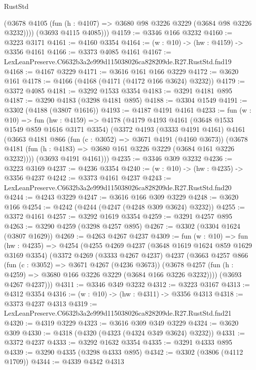 \begin{lexlean}{RustStd}
\begin{coremodule}
          (@3678 @4105 (fun (h : @4107) => @3680 @98 @3226 @3229 (@3684 @98 @3226 @3232))))
        (@3693 @4115 @4085)))
@4159 := @3346 @166 @3232
@4160 := @3223 @3171
@4161 := @4160 @3354
@4164 := (w : @10) -> (hw : @4159) -> @3356 @4161
@4166 := @3373 @4085 @4161
@4167 := LexLeanPreserve.C6632b3a2e999d115038026ca828209de.R27.RustStd.fnd19
@4168 := @4167 @3229
@4171 := @3616 @161 @166 @3229
@4172 := @3620 @161
@4178 := @4166 (@4168 (@4171 (@4172 @166 @3624) @3232))
@4179 := @3372 @4085
@4181 := @3292 @1533 @3354
@4183 := @3291 @4181 @895
@4187 := @3290 @4183 (@3298 @4181 @895)
@4188 := @3304 @1549
@4191 := @3302 (@4188 (@3807 @1616))
@4193 := @4187 @4191 @4161
@4233 := fun (w : @10) =>
  fun (hw : @4159) =>
  @4178
    (@4179
      @4193
      @4161
      (@3648 @1533 @1549 @859 @1616 @3171 @3354)
      (@3372
        @4193
        (@3333 @4191 @4161)
        @4161
        (@3663
          @4181
          @866
          (fun (c : @3052) => @3671 @4191 (@4160 @3673))
          (@3678 @4181 (fun (h : @4183) => @3680 @161 @3226 @3229 (@3684 @161 @3226 @3232))))
        (@3693 @4191 @4161)))
@4235 := @3346 @309 @3232
@4236 := @3223 @3169
@4237 := @4236 @3354
@4240 := (w : @10) -> (hw : @4235) -> @3356 @4237
@4242 := @3373 @4161 @4237
@4243 := LexLeanPreserve.C6632b3a2e999d115038026ca828209de.R27.RustStd.fnd20
@4244 := @4243 @3229
@4247 := @3616 @166 @309 @3229
@4248 := @3620 @166
@4254 := @4242 (@4244 (@4247 (@4248 @309 @3624) @3232))
@4255 := @3372 @4161
@4257 := @3292 @1619 @3354
@4259 := @3291 @4257 @895
@4263 := @3290 @4259 (@3298 @4257 @895)
@4267 := @3302 (@3304 @1624 (@3807 @1629))
@4269 := @4263 @4267 @4237
@4309 := fun (w : @10) =>
  fun (hw : @4235) =>
  @4254
    (@4255
      @4269
      @4237
      (@3648 @1619 @1624 @859 @1629 @3169 @3354)
      (@3372
        @4269
        (@3333 @4267 @4237)
        @4237
        (@3663
          @4257
          @866
          (fun (c : @3052) => @3671 @4267 (@4236 @3673))
          (@3678 @4257 (fun (h : @4259) => @3680 @166 @3226 @3229 (@3684 @166 @3226 @3232))))
        (@3693 @4267 @4237)))
@4311 := @3346 @349 @3232
@4312 := @3223 @3167
@4313 := @4312 @3354
@4316 := (w : @10) -> (hw : @4311) -> @3356 @4313
@4318 := @3373 @4237 @4313
@4319 := LexLeanPreserve.C6632b3a2e999d115038026ca828209de.R27.RustStd.fnd21
@4320 := @4319 @3229
@4323 := @3616 @309 @349 @3229
@4324 := @3620 @309
@4330 := @4318 (@4320 (@4323 (@4324 @349 @3624) @3232))
@4331 := @3372 @4237
@4333 := @3292 @1632 @3354
@4335 := @3291 @4333 @895
@4339 := @3290 @4335 (@3298 @4333 @895)
@4342 := @3302 (@3806 (@4112 @1709))
@4344 := @4339 @4342 @4313

\end{coremodule}
\end{lexlean}
